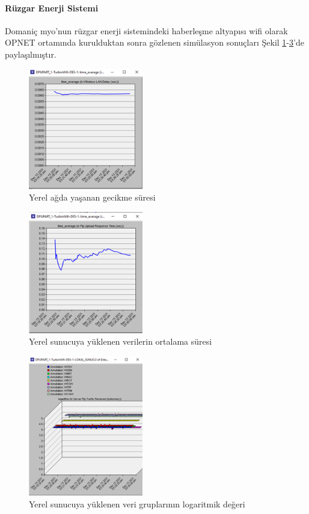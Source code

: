 \paragraph{Rüzgar Enerji Sistemi}

Domaniç \gls{myo}'nun rüzgar enerji sistemindeki haberleşme altyapısı \gls{wifi} olarak OPNET ortamında kurulduktan sonra gözlenen simülasyon sonuçları Şekil \ref{fig:4-20}-\ref{fig:4-22}’de paylaşılmıştır.

\begin{figure}[htbp]
\centerline{\includegraphics[width=5cm]{Resim/Sekil4-19.png}}
\caption{Yerel ağda yaşanan gecikme süresi}
\label{fig:4-20}
\end{figure}

\begin{figure}[htbp]
\centerline{\includegraphics[width=5cm]{Resim/Sekil4-20.png}}
\caption{Yerel sunucuya yüklenen verilerin ortalama süresi}
\label{fig:4-21}
\end{figure}


\begin{figure}[htbp]
\centerline{\includegraphics[width=5cm]{Resim/Sekil4-21.png}}
\caption{Yerel sunucuya yüklenen veri gruplarının logaritmik değeri}
\label{fig:4-22}
\end{figure}

